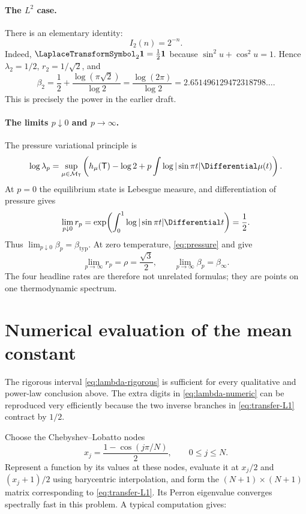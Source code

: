 \documentclass[11pt,oneside]{article}
\theoremstyle{definition}
\theoremstyle{remark}
\newcommand{\T}{\mathsf T}
\begin{document}
\paragraph{The $L^2$ case.}
There is an elementary identity:
\begin{equation}\label{eq:L2-exact}
 I_2(n)=2^{-n}.
\end{equation}
Indeed, $\LaplaceTransformSymbol_2\mathbf1=\tfrac12\mathbf1$ because
$\sin^2u+\cos^2u=1$.  Hence $\lambda_2=1/2$,
$r_2=1/\sqrt2$, and
\begin{equation}\label{eq:beta2}
 \beta_2
 =\frac12+\frac{\log(\pi\sqrt2)}{\log2}
 =\frac{\log(2\pi)}{\log2}
 =2.651496129472318798\ldots .
\end{equation}
This is precisely the power in the earlier draft.

\paragraph{The limits $p\downarrow0$ and $p\to\infty$.}
The pressure variational principle is
\begin{equation}\label{eq:pressure}
 \log\lambda_p
 =\sup_{\mu\in\mathcal M_\T}
 \left(h_\mu(\T)-\log2
 +p\int\log|\sin\pi t|\Differential\mu(t)\right).
\end{equation}
At $p=0$ the equilibrium state is Lebesgue measure, and differentiation of pressure gives
\[
 \lim_{p\downarrow0}r_p
 =\exp\!\left(\int_0^1\log|\sin\pi t|\Differential t\right)=\frac12.
\]
Thus $\lim_{p\downarrow0}\beta_p=\beta_{\mathrm{typ}}$.  At zero temperature,
\eqref{eq:pressure} and  give
\[
 \lim_{p\to\infty}r_p=\rho=\frac{\sqrt3}{2},
 \qquad
 \lim_{p\to\infty}\beta_p=\beta_\infty.
\]
The four headline rates are therefore not unrelated formulas; they are points on one
thermodynamic spectrum.

\section{Numerical evaluation of the mean constant}\label{sec:numerics}

The rigorous interval \eqref{eq:lambda-rigorous} is sufficient for every qualitative and
power-law conclusion above.  The extra digits in \eqref{eq:lambda-numeric} can be
reproduced very efficiently because the two inverse branches in \eqref{eq:transfer-L1}
contract by $1/2$.

Choose the Chebyshev--Lobatto nodes
\begin{equation}\label{eq:cheb-nodes}
 x_j=\frac{1-\cos(j\pi/N)}2,
 \qquad 0\le j\le N.
\end{equation}
Represent a function by its values at these nodes, evaluate it at $x_j/2$ and
$(x_j+1)/2$ using barycentric interpolation, and form the $(N+1)\times(N+1)$ matrix
corresponding to \eqref{eq:transfer-L1}.  Its Perron eigenvalue converges spectrally fast
in this problem.  A typical computation gives:
\end{document}

